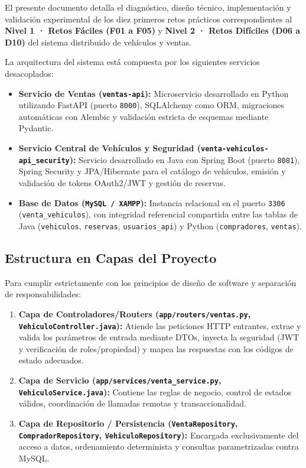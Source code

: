 \documentclass[11pt,a4paper]{article}
\begin{document}
El presente documento detalla el diagnóstico, diseño técnico, implementación y validación experimental de los diez primeros retos prácticos correspondientes al \textbf{Nivel 1 · Retos Fáciles (F01 a F05)} y \textbf{Nivel 2 · Retos Difíciles (D06 a D10)} del sistema distribuido de vehículos y ventas.

La arquitectura del sistema está compuesta por los siguientes servicios desacoplados:
\begin{itemize}
    \item \textbf{Servicio de Ventas (\texttt{ventas-api}):} Microservicio desarrollado en Python utilizando FastAPI (puerto \texttt{8000}), SQLAlchemy como ORM, migraciones automáticas con Alembic y validación estricta de esquemas mediante Pydantic.
    \item \textbf{Servicio Central de Vehículos y Seguridad (\texttt{venta-vehiculos-api\_security}):} Servicio desarrollado en Java con Spring Boot (puerto \texttt{8081}), Spring Security y JPA/Hibernate para el catálogo de vehículos, emisión y validación de tokens OAuth2/JWT y gestión de reservas.
    \item \textbf{Base de Datos (\texttt{MySQL / XAMPP}):} Instancia relacional en el puerto \texttt{3306} (\texttt{venta\_vehiculos}), con integridad referencial compartida entre las tablas de Java (\texttt{vehiculos}, \texttt{reservas}, \texttt{usuarios\_api}) y Python (\texttt{compradores}, \texttt{ventas}).
\end{itemize}

\subsection{Estructura en Capas del Proyecto}
Para cumplir estrictamente con los principios de diseño de software y separación de responsabilidades:
\begin{enumerate}
    \item \textbf{Capa de Controladores/Routers (\texttt{app/routers/ventas.py}, \texttt{VehiculoController.java}):} Atiende las peticiones HTTP entrantes, extrae y valida los parámetros de entrada mediante DTOs, inyecta la seguridad (JWT y verificación de roles/propiedad) y mapea las respuestas con los códigos de estado adecuados.
    \item \textbf{Capa de Servicio (\texttt{app/services/venta\_service.py}, \texttt{VehiculoService.java}):} Contiene las reglas de negocio, control de estados válidos, coordinación de llamadas remotas y transaccionalidad.
    \item \textbf{Capa de Repositorio / Persistencia (\texttt{VentaRepository}, \texttt{CompradorRepository}, \texttt{VehiculoRepository}):} Encargada exclusivamente del acceso a datos, ordenamiento determinista y consultas parametrizadas contra MySQL.
\end{enumerate}
\end{document}

